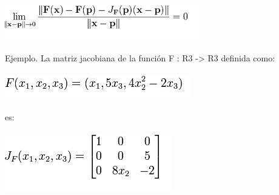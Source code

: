 \documentclass[12pt,a4paper]{article}
\begin{document}
\includegraphics[scale=1]{primera.jpg}
\\\\
Ejemplo. La matriz jacobiana de la función F : R3 -> R3 definida como:
\\\\
\includegraphics[scale=1]{segunda.jpg} 
\\\\
es:
\\\\
\includegraphics[scale=1]{tercera.jpg}
\end{document}
